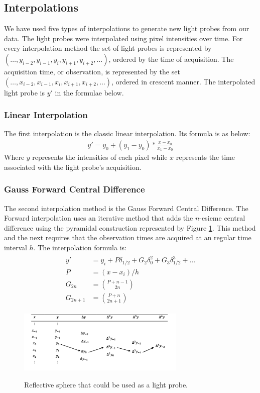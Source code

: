 \documentclass[conference]{acmsiggraph}
\begin{document}
\subsection{Interpolations}
	We have used five types of  interpolations to generate new light probes from our data. The light probes were interpolated  using pixel intensities over time.
For every interpolation method the set of light probes is represented by $(\dots,y_{i-2},y_{i-1},y_i,y_{i+1},y_{i+2},\dots)$, ordered by the time of acquisition.
The acquisition time, or observation, is represented by the set $(\dots,x_{i-2},x_{i-1},x_i,x_{i+1},x_{i+2},\dots)$, ordered in crescent manner. The interpolated
light probe is $y'$ in the formulae below.
\subsubsection{Linear Interpolation}
	The first interpolation is the classic linear interpolation. Its formula is as below: 
\begin{align}
	y' = y_0 + (y_1-y_0)*\frac{x-x_0}{x_1-x_0}
\end{align}
Where $y$ represents the intensities of each pixel while $x$ represents the time associated with the light probe's acquisition.

\subsubsection{Gauss Forward Central Difference}
	The second interpolation method is the Gauss Forward Central Difference. The Forward interpolation uses an iterative method that adds the $n$-esieme central 
difference\cite{abramowitz1972handbook} using the pyramidal construction represented by Figure \ref{fig:fowardcentral}. This method and the next requires
that the observation times are acquired at an regular time interval $h$. The interpolation formula is:
\begin{align}
\begin{split}
	y' &= 	y_i + P \delta_{1/2} + G_2 \delta_0^2 + G_3 \delta_{1/2}^3 + \dots\\
	P &= (x-x_i)/h \\
	G_{2n} &= \binom{P+n-1}{2n} \\
	G_{2n+1} &= \binom{P+n}{2n+1}
\end{split}
\end{align}

\begin{figure}[H]
	\caption{Reflective sphere that could be used as a light probe.}
	\centering
	\includegraphics[width=08cm]{images/forward.png}
	\label{fig:fowardcentral}
\end{figure}
\end{document}
